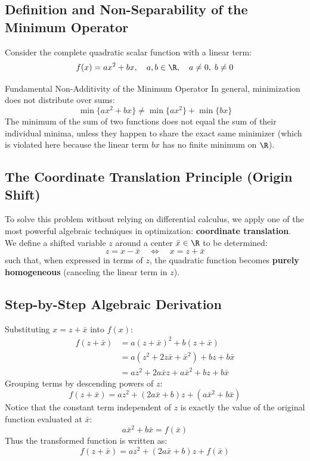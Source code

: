 \subsection{Definition and Non-Separability of the Minimum Operator}
Consider the complete quadratic scalar function with a linear term:
\begin{equation}
f(x) = ax^2 + bx, \quad a, b \in \R, \quad a \neq 0, \; b \neq 0
\end{equation}

\begin{alertblock}{Fundamental Non-Additivity of the Minimum Operator}
In general, minimization does not distribute over sums:
\begin{equation}
\min \{ ax^2 + bx \} \neq \min \{ ax^2 \} + \min \{ bx \}
\end{equation}
The minimum of the sum of two functions does not equal the sum of their individual minima, unless they happen to share the exact same minimizer (which is violated here because the linear term $bx$ has no finite minimum on $\R$).
\end{alertblock}

\subsection{The Coordinate Translation Principle (Origin Shift)}
To solve this problem without relying on differential calculus, we apply one of the most powerful algebraic techniques in optimization: \textbf{coordinate translation}.
We define a shifted variable $z$ around a center $\bar{x} \in \R$ to be determined:
\begin{equation}
z = x - \bar{x} \quad \Longleftrightarrow \quad x = z + \bar{x}
\end{equation}
such that, when expressed in terms of $z$, the quadratic function becomes \textbf{purely homogeneous} (canceling the linear term in $z$).

\subsection{Step-by-Step Algebraic Derivation}
Substituting $x = z + \bar{x}$ into $f(x)$:
\begin{align}
f(z + \bar{x}) &= a(z + \bar{x})^2 + b(z + \bar{x}) \nonumber\\
&= a\left(z^2 + 2z\bar{x} + \bar{x}^2\right) + bz + b\bar{x} \nonumber\\
&= az^2 + 2a\bar{x}z + a\bar{x}^2 + bz + b\bar{x}
\end{align}
Grouping terms by descending powers of $z$:
\begin{equation}
f(z + \bar{x}) = az^2 + (2a\bar{x} + b)z + \left(a\bar{x}^2 + b\bar{x}\right)
\end{equation}
Notice that the constant term independent of $z$ is exactly the value of the original function evaluated at $\bar{x}$:
\begin{equation}
a\bar{x}^2 + b\bar{x} = f(\bar{x})
\end{equation}
Thus the transformed function is written as:
\begin{equation}
f(z + \bar{x}) = az^2 + (2a\bar{x} + b)z + f(\bar{x})
\end{equation}

